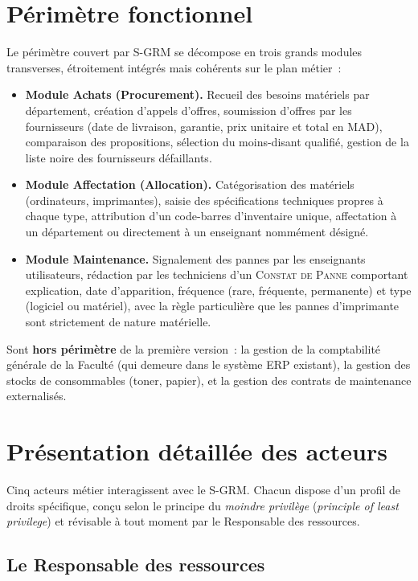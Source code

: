\documentclass[a4paper,11pt,openany]{report}
\newcommand{\constat}{\textsc{Constat de Panne}}
\newcommand{\mad}{MAD}
\begin{document}
\section{Périmètre fonctionnel}

Le périmètre couvert par S-GRM se décompose en trois grands
modules transverses, étroitement intégrés mais cohérents sur le
plan métier~:

\begin{itemize}
  \item \textbf{Module Achats (Procurement).} Recueil des besoins
    matériels par département, création d'appels d'offres,
    soumission d'offres par les fournisseurs (date de livraison,
    garantie, prix unitaire et total en \mad), comparaison des
    propositions, sélection du moins-disant qualifié, gestion
    de la liste noire des fournisseurs défaillants.
  \item \textbf{Module Affectation (Allocation).} Catégorisation
    des matériels (ordinateurs, imprimantes), saisie des
    spécifications techniques propres à chaque type, attribution
    d'un code-barres d'inventaire unique, affectation à un
    département ou directement à un enseignant nommément désigné.
  \item \textbf{Module Maintenance.} Signalement des pannes par
    les enseignants utilisateurs, rédaction par les techniciens
    d'un \constat{} comportant explication, date d'apparition,
    fréquence (rare, fréquente, permanente) et type (logiciel ou
    matériel), avec la règle particulière que les pannes
    d'imprimante sont strictement de nature matérielle.
\end{itemize}

Sont \textbf{hors périmètre} de la première version~: la gestion
de la comptabilité générale de la Faculté (qui demeure dans le
système ERP existant), la gestion des stocks de consommables
(toner, papier), et la gestion des contrats de maintenance
externalisés.

\section{Présentation détaillée des acteurs}

Cinq acteurs métier interagissent avec le S-GRM. Chacun dispose
d'un profil de droits spécifique, conçu selon le principe du
\emph{moindre privilège} (\textit{principle of least privilege})
et révisable à tout moment par le Responsable des ressources.

\subsection{Le Responsable des ressources}
\end{document}
